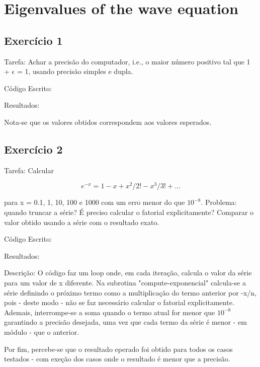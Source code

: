 \documentclass[12pt, a4paper]{article} %
\begin{document}
\section{Eigenvalues of the wave equation}

    \subsection{Exerc\'icio 1}

        Tarefa: Achar a precis\~ao  do computador, i.e., o maior n\'umero positivo  tal que
        1 + $\epsilon$ = 1, usando precis\~ao simples e dupla.

        C\'odigo Escrito:
        

        Resultados:

        Nota-se que os valores obtidos correspondem aos valores esperados.

    \subsection{Exerc\'icio 2}

        Tarefa: Calcular

        \begin{equation} e^{-x} = 1 - x + x^2/2! - x^3/3! + ... \end{equation}

        para x = 0.1, 1, 10, 100 e 1000 com um erro menor do que $10^{-8}$. Problema: quando truncar a s\'erie? \'E preciso calcular o fatorial explicitamente? Comparar o valor obtido usando a s\'erie com o resultado exato.

        C\'odigo Escrito:
        

        Resultados:

        Descri\c{c}\~ao: O c\'odigo faz um loop onde, em cada itera\c{c}\~ao, calcula o valor da s\'erie para um valor de x diferente. Na subrotina "compute-exponencial" calcula-se a s\'erie definindo o pr\'oximo termo como a multiplica\c{c}\~ao do termo anterior por -x/n, pois - deste modo - n\~ao se faz necess\'ario calcular o fatorial explicitamente. Ademais, interrompe-se a soma quando o termo atual for menor que $10^{-8}$ garantindo a precis\~ao desejada, uma vez que cada termo da s\'erie \'e menor - em m\'odulo - que o anterior.

        Por fim, percebe-se que o resultado eperado foi obtido para todos os casos testados - com exe\c{c}\~ao dos casos onde o resultado \'e menor que a precis\~ao.
\end{document}
